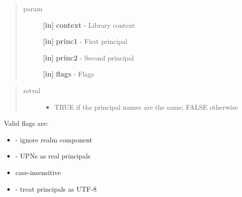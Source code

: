 \documentclass[letterpaper,10pt,english]{sphinxmanual}
\begin{document}
\begin{quote}\begin{description}
\item[{param}] \leavevmode
\textbf{{[}in{]}} \textbf{context} - Library context

\textbf{{[}in{]}} \textbf{princ1} - First principal

\textbf{{[}in{]}} \textbf{princ2} - Second principal

\textbf{{[}in{]}} \textbf{flags} - Flags

\end{description}\end{quote}
\begin{quote}\begin{description}
\item[{retval}] \leavevmode\begin{itemize}
\item {} 
TRUE   if the principal names are the same; FALSE otherwise

\end{itemize}

\end{description}\end{quote}

Valid flags are:
\begin{itemize}
\item {} 
{\hyperref[appdev/refs/macros/KRB5_PRINCIPAL_COMPARE_IGNORE_REALM:KRB5_PRINCIPAL_COMPARE_IGNORE_REALM]{}} - ignore realm component

\item {} 
{\hyperref[appdev/refs/macros/KRB5_PRINCIPAL_COMPARE_ENTERPRISE:KRB5_PRINCIPAL_COMPARE_ENTERPRISE]{}} - UPNs as real principals

\item {} 
{\hyperref[appdev/refs/macros/KRB5_PRINCIPAL_COMPARE_CASEFOLD:KRB5_PRINCIPAL_COMPARE_CASEFOLD]{}} case-insensitive

\item {} 
{\hyperref[appdev/refs/macros/KRB5_PRINCIPAL_COMPARE_UTF8:KRB5_PRINCIPAL_COMPARE_UTF8]{}} - treat principals as UTF-8

\end{itemize}




{\hyperref[appdev/refs/api/krb5_principal_compare:krb5_principal_compare]{}}
\end{document}

